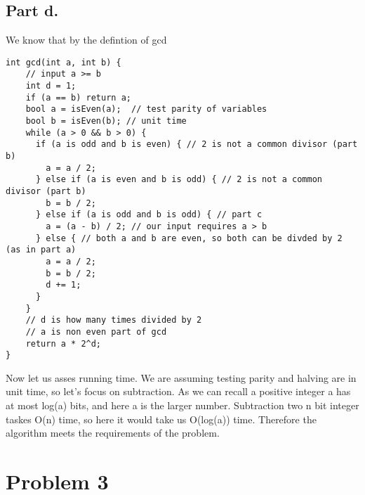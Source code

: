 \documentclass[]{article}
\begin{document}
\pagebreak

\subsection{Part d.}\label{part-d.}

We know that by the defintion of gcd

\begin{verbatim}
int gcd(int a, int b) {
    // input a >= b
    int d = 1;
    if (a == b) return a;
    bool a = isEven(a);  // test parity of variables
    bool b = isEven(b); // unit time
    while (a > 0 && b > 0) {
      if (a is odd and b is even) { // 2 is not a common divisor (part b)
        a = a / 2;
      } else if (a is even and b is odd) { // 2 is not a common divisor (part b)
        b = b / 2;
      } else if (a is odd and b is odd) { // part c
        a = (a - b) / 2; // our input requires a > b
      } else { // both a and b are even, so both can be divded by 2 (as in part a)
        a = a / 2;
        b = b / 2;
        d += 1;
      }
    }
    // d is how many times divided by 2
    // a is non even part of gcd
    return a * 2^d;
}
\end{verbatim}

Now let us asses running time. We are assuming testing parity and
halving are in unit time, so let's focus on subtraction. As we can
recall a positive integer a has at most log(a) bits, and here a is the
larger number. Subtraction two n bit integer taskes O(n) time, so here
it would take us O(log(a)) time. Therefore the algorithm meets the
requirements of the problem.

\pagebreak

\section{Problem 3}\label{problem-3}
\end{document}
